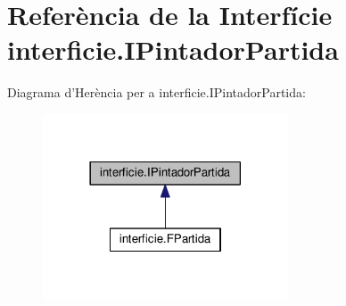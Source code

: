 \hypertarget{interfaceinterficie_1_1_i_pintador_partida}{\section{Referència de la Interfície interficie.\+I\+Pintador\+Partida}
\label{interfaceinterficie_1_1_i_pintador_partida}
}


Diagrama d'Herència per a interficie.\+I\+Pintador\+Partida\+:\nopagebreak
\begin{figure}[H]
\begin{center}
\leavevmode
\includegraphics[width=206pt]{interfaceinterficie_1_1_i_pintador_partida__inherit__graph}
\end{center}
\end{figure}
